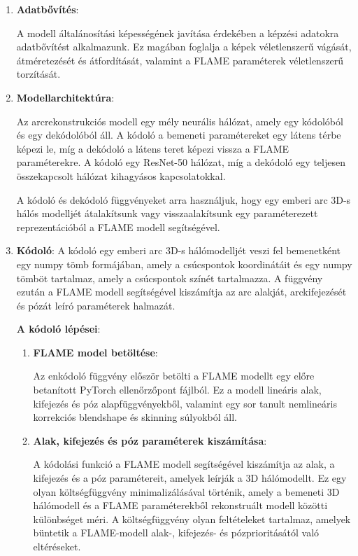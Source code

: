 \documentclass[12pt,a4]{article}
\begin{document}
    \begin{enumerate}
        \item \textbf{Adatbővítés}:
        
        A modell általánosítási képességének javítása érdekében a képzési adatokra adatbővítést alkalmazunk. Ez magában foglalja a képek véletlenszerű vágását, átméretezését és átfordítását, valamint a FLAME paraméterek véletlenszerű torzítását.
        \item \textbf{Modellarchitektúra}:
        
        Az arcrekonstrukciós modell egy mély neurális hálózat,
 amely egy kódolóból és egy dekódolóból áll. 
 A kódoló a bemeneti paramétereket egy látens térbe képezi le, 
 míg a dekódoló a látens teret képezi vissza a FLAME paraméterekre. 
 A kódoló egy ResNet-50 hálózat, míg a dekódoló egy teljesen összekapcsolt hálózat kihagyásos kapcsolatokkal.

A kódoló és dekódoló függvényeket arra használjuk, hogy egy emberi arc 3D-s hálós modelljét átalakítsunk vagy visszaalakítsunk egy paraméterezett reprezentációból a FLAME modell segítségével.

        \item \textbf{Kódoló}:
        A kódoló egy emberi arc 3D-s hálómodelljét veszi fel bemenetként egy numpy tömb formájában, amely a csúcspontok koordinátáit és egy numpy tömböt tartalmaz, amely a csúcspontok színét tartalmazza.
A függvény ezután a FLAME modell segítségével kiszámítja az arc alakját, arckifejezését és pózát leíró paraméterek halmazát.

        \textbf{A kódoló lépései}:
        \begin{enumerate}
            \item \textbf{FLAME model betöltése}:
            
            Az enkódoló függvény először betölti a FLAME modellt egy előre betanított PyTorch ellenőrzőpont fájlból. 
Ez a modell lineáris alak, kifejezés és póz alapfüggvényekből, valamint egy sor tanult nemlineáris korrekciós blendshape és skinning súlyokból áll.

            \item \textbf{Alak, kifejezés és póz paraméterek kiszámítása}:
            
            A kódolási funkció a FLAME modell segítségével kiszámítja az alak, a kifejezés és a póz paramétereit, amelyek leírják a 3D hálómodellt. 
Ez egy olyan költségfüggvény minimalizálásával történik, amely a bemeneti 3D hálómodell és a FLAME paraméterekből rekonstruált modell közötti különbséget méri. 
A költségfüggvény olyan feltételeket tartalmaz, amelyek büntetik a FLAME-modell alak-, kifejezés- és pózprioritásától való eltéréseket.


\end{enumerate}
\end{enumerate}
\end{document}
